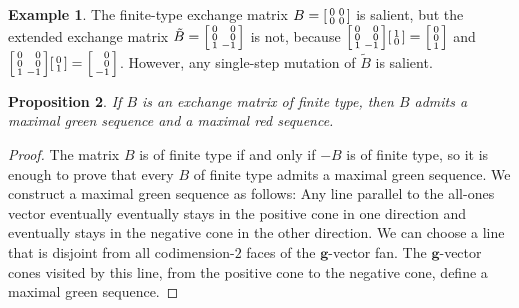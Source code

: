 \documentclass{amsart}
\newtheorem{proposition}{Proposition}[section]
\theoremstyle{definition}
\newtheorem{example}[proposition]{Example}
\theoremstyle{remark}
\numberwithin{equation}{section}
\newcommand{\0}{{\mathbf{0}}}
\newcommand{\g}{\mathbf{g}}
\newcommand{\tB}{{\tilde{B}}}
\begin{document}
\begin{example}\label{0000 bad}
The finite-type exchange matrix $B=\begin{bsmallmatrix}0&0\\0&0\end{bsmallmatrix}$ is salient, but the extended exchange matrix $\tB=\begin{bsmallmatrix*}[r]0&0\\0&0\\1&-1\end{bsmallmatrix*}$ is not, because $\begin{bsmallmatrix*}[r]0&0\\0&0\\1&-1\end{bsmallmatrix*}\begin{bsmallmatrix}1\\0\end{bsmallmatrix}=\begin{bsmallmatrix}0\\0\\1\end{bsmallmatrix}$ and $\begin{bsmallmatrix*}[r]0&0\\0&0\\1&-1\end{bsmallmatrix*}\begin{bsmallmatrix}0\\1\end{bsmallmatrix}=\begin{bsmallmatrix*}[r]0\\0\\-1\end{bsmallmatrix*}$.
However, any single-step mutation of $\tB$ is salient.
\end{example}

\begin{proposition}\label{fin red}
If $B$ is an exchange matrix of finite type, then $B$ admits a maximal green sequence and a maximal red sequence.
\end{proposition}
\begin{proof}
The matrix $B$ is of finite type if and only if $-B$ is of finite type, so it is enough to prove that every $B$ of finite type admits a maximal green sequence.
We construct a maximal green sequence as follows:
Any line parallel to the all-ones vector eventually eventually stays in the positive cone in one direction and eventually stays in the negative cone in the other direction.
We can choose a line that is disjoint from all codimension-$2$ faces of the $\g$-vector fan.
The $\g$-vector cones visited by this line, from the positive cone to the negative cone, define a maximal green sequence.
\end{proof}
\end{document}
